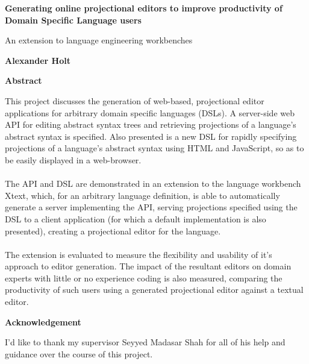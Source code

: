 \documentclass{article}
\begin{document}
\clearpage
%
\thispagestyle{plain}
\begin{center}
    \Large
    \textbf{Generating online projectional editors to improve productivity of Domain Specific Language users}
    
    \vspace{0.4cm}
    \large
    An extension to language engineering workbenches
    
    \vspace{0.4cm}
    \textbf{Alexander Holt}
    
    \vspace{0.9cm}
    \textbf{Abstract}
\end{center}
This project discusses the generation of web-based, projectional editor applications for arbitrary domain specific languages (DSLs). A server-side web API for editing abstract syntax trees and retrieving projections of a language's abstract syntax is specified. Also presented is a new DSL for rapidly specifying projections of a language's abstract syntax using HTML and JavaScript, so as to be easily displayed in a web-browser. 
\\
\\
The API and DSL are demonstrated in an extension to the language workbench Xtext, which, for an arbitrary language definition, is able to automatically generate a server implementing the API, serving projections specified using the DSL to a client application (for which a default implementation is also presented), creating a projectional editor for the language.
\\
\\
The extension is evaluated to measure the flexibility and usability of it's approach to editor generation. The impact of the resultant editors on domain experts with little or no experience coding is also measured, comparing the productivity of such users using a generated projectional editor against a textual editor. 
\begin{center}
	\vspace {1.5cm}
    \Large
    \textbf{Acknowledgement}
\end{center}
I'd like to thank my supervisor Seyyed Madasar Shah for all of his help and guidance over the course of this project.
\end{document}

